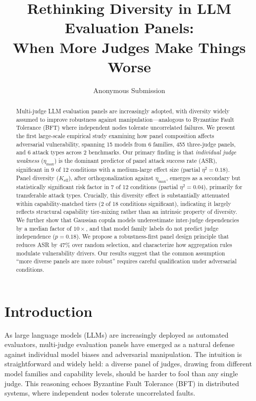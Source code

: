 \documentclass[11pt,a4paper]{article}
\title{Rethinking Diversity in LLM Evaluation Panels:\\When More Judges Make Things Worse}
\author{Anonymous Submission}
\date{}
\newcommand{\keff}{K_{\text{eff}}}
\newcommand{\etamax}{\eta_{\max}}
\begin{document}
\maketitle

\begin{abstract}
Multi-judge LLM evaluation panels are increasingly adopted, with diversity widely assumed to improve robustness against manipulation---analogous to Byzantine Fault Tolerance (BFT) where independent nodes tolerate uncorrelated failures. We present the first large-scale empirical study examining how panel composition affects adversarial vulnerability, spanning 15 models from 6 families, 455 three-judge panels, and 6 attack types across 2 benchmarks. Our primary finding is that \emph{individual judge weakness} ($\etamax$) is the dominant predictor of panel attack success rate (ASR), significant in 9 of 12 conditions with a medium-large effect size (partial $\eta^2 = 0.18$). Panel diversity ($\keff$), after orthogonalization against $\etamax$, emerges as a secondary but statistically significant risk factor in 7 of 12 conditions (partial $\eta^2 = 0.04$), primarily for transferable attack types. Crucially, this diversity effect is substantially attenuated within capability-matched tiers (2 of 18 conditions significant), indicating it largely reflects structural capability tier-mixing rather than an intrinsic property of diversity. We further show that Gaussian copula models underestimate inter-judge dependencies by a median factor of $10\times$, and that model family labels do not predict judge independence ($p = 0.18$). We propose a robustness-first panel design principle that reduces ASR by 47\% over random selection, and characterize how aggregation rules modulate vulnerability drivers. Our results suggest that the common assumption ``more diverse panels are more robust'' requires careful qualification under adversarial conditions.
\end{abstract}

\section{Introduction}

As large language models (LLMs) are increasingly deployed as automated evaluators, multi-judge evaluation panels have emerged as a natural defense against individual model biases and adversarial manipulation. The intuition is straightforward and widely held: a diverse panel of judges, drawing from different model families and capability levels, should be harder to fool than any single judge. This reasoning echoes Byzantine Fault Tolerance (BFT) in distributed systems, where independent nodes tolerate uncorrelated faults.
\end{document}
